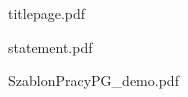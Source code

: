 \documentclass[a4paper]{book}
\begin{document}

    {titlepage.pdf}     %


    {statement.pdf}     %


    {SzablonPracyPG_demo.pdf} %
\end{document}
